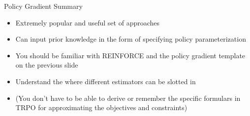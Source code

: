 \documentclass[aspectratio=169]{../latex_main/tntbeamer}  %
\begin{document}
\begin{frame}[c]{Policy Gradient Summary}

\begin{itemize}
    \item Extremely popular and useful set of approaches
    \item Can input prior knowledge in the form of specifying policy parameterization
    \item You should be familiar with REINFORCE and the policy gradient template on the previous slide
    \item Understand the where different estimators can be slotted in 
    \item (You don't have to be able to derive or remember the specific formulars in TRPO for approximating the objectives and constraints)
\end{itemize}

\end{frame}
\end{document}
